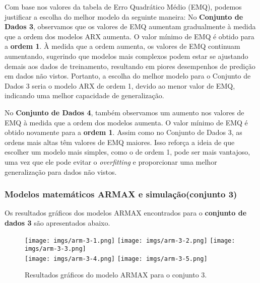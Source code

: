 \documentclass[a4paper,12pt]{article}
\begin{document}
Com base nos valores da tabela de Erro Quadrático Médio (EMQ), podemos justificar a escolha do melhor modelo da seguinte maneira: No \textbf{Conjunto de Dados 3}, observamos que os valores de EMQ aumentam gradualmente à medida que a ordem dos modelos ARX aumenta. O valor mínimo de EMQ é obtido para a \textbf{ordem 1}. À medida que a ordem aumenta, os valores de EMQ continuam aumentando, sugerindo que modelos mais complexos podem estar se ajustando demais aos dados de treinamento, resultando em piores desempenhos de predição em dados não vistos. Portanto, a escolha do melhor modelo para o Conjunto de Dados 3 seria o modelo ARX de ordem 1, devido ao menor valor de EMQ, indicando uma melhor capacidade de generalização.

No \textbf{Conjunto de Dados 4}, também observamos um aumento nos valores de EMQ à medida que a ordem dos modelos aumenta. O valor mínimo de EMQ é obtido novamente para a \textbf{ordem 1}. Assim como no Conjunto de Dados 3, as ordens mais altas têm valores de EMQ maiores. Isso reforça a ideia de que escolher um modelo mais simples, como o de ordem 1, pode ser mais vantajoso, uma vez que ele pode evitar o \textit{overfitting} e proporcionar uma melhor generalização para dados não vistos.

\subsubsection{Modelos matemáticos ARMAX e simulação(conjunto 3)}

Os resultados gráficos dos modelos ARMAX encontrados para o \textbf{conjunto de dados 3} são apresentados abaixo.

\begin{figure}[h!]
\centering

\texttt{[image: imgs/arm-3-1.png]} \quad
\texttt{[image: imgs/arm-3-2.png]} \quad
\texttt{[image: imgs/arm-3-3.png]} \\

\texttt{[image: imgs/arm-3-4.png]} \quad
\texttt{[image: imgs/arm-3-5.png]}

\caption{Resultados gráficos do modelo ARMAX para o conjunto 3.}
\end{figure}
\end{document}
